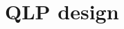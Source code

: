 \documentclass[class=report,11pt,crop=false]{standalone}
\begin{document}
\ifstandalone
\tableofcontents
\fi
\chapter{QLP design \label{ch:QLPdesign}}



 
\end{document}
